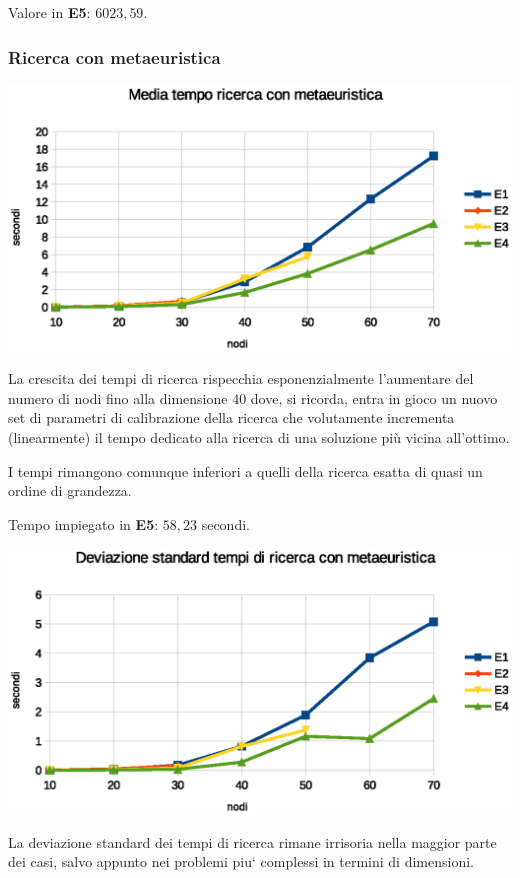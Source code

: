 \documentclass[a4paper]{article}
\begin{document}
                Valore in \textbf{E5}: $6023,59$.

            \subsubsection{Ricerca con metaeuristica}

                    \includegraphics[scale=0.7]{img/gavgtime}

                    La crescita dei tempi di ricerca rispecchia esponenzialmente l'aumentare del numero di nodi fino alla dimensione 40 dove, si ricorda, entra in gioco un nuovo set di parametri di calibrazione della ricerca che volutamente incrementa (linearmente) il tempo dedicato alla ricerca di una soluzione pi\`u vicina all'ottimo.

                    I tempi rimangono comunque inferiori a quelli della ricerca esatta di quasi un ordine di grandezza.

                    Tempo impiegato in \textbf{E5}: $58,23$ secondi.

                    \includegraphics[scale=0.7]{img/gadevtime}

                    La deviazione standard dei tempi di ricerca rimane irrisoria nella maggior parte dei casi, salvo appunto nei problemi piu` complessi in termini di dimensioni.
\end{document}
